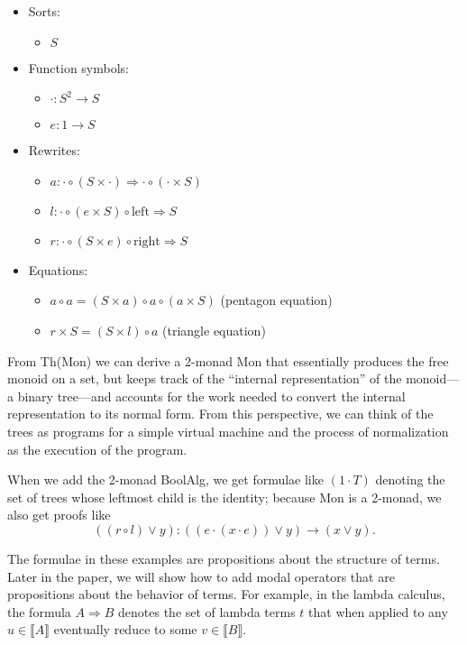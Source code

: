 \documentclass{article}
\newcommand{\interp}[1]{\llbracket #1 \rrbracket}
\newcommand{\maps}{\colon}
\renewcommand{\left}{\mathrm{left}}
\renewcommand{\right}{\mathrm{right}}
\begin{document}
\begin{center}
  \begin{itemize}
    \item Sorts:
    \begin{itemize}
      \item $S$
    \end{itemize}
    \item Function symbols:
    \begin{itemize}
      \item $\cdot\maps S^2 \to S$
      \item $e\maps 1 \to S$
    \end{itemize}
    \item Rewrites:
    \begin{itemize}
      \item $a\maps \cdot \circ (S \times \cdot) \Rightarrow \cdot \circ (\cdot \times S)$
      \item $l\maps \cdot \circ (e \times S) \circ \left \Rightarrow S$
      \item $r\maps \cdot \circ (S \times e) \circ \right \Rightarrow S$
    \end{itemize}
    \item Equations:
    \begin{itemize}
      \item $a \circ a = (S \times a) \circ a \circ (a \times S)$ (pentagon equation)
      \item $r \times S = (S \times l) \circ a$ (triangle equation)
    \end{itemize}
  \end{itemize}
\end{center}
From Th(Mon) we can derive a 2-monad Mon that essentially produces the free monoid on a set, but keeps track of the ``internal representation'' of the monoid---a binary tree---and accounts for the work needed to convert the internal representation to its normal form.  From this perspective, we can think of the trees as programs for a simple virtual machine and the process of normalization as the execution of the program.

When we add the 2-monad BoolAlg, we get formulae like $(1 \cdot T)$ denoting the set of trees whose leftmost child is the identity; because Mon is a 2-monad, we also get proofs like 
\[ ((r \circ l) \lor y)\maps ((e \cdot (x \cdot e)) \lor y) \to (x \lor y). \]

The formulae in these examples are propositions about the structure of terms.  Later in the paper, we will show how to add modal operators that are propositions about the behavior of terms.  For example, in the lambda calculus, the formula ${A \Rightarrow B}$ denotes the set of lambda terms $t$ that when applied to any $u \in \interp{A}$ eventually reduce to some $v \in \interp{B}.$
\end{document}
